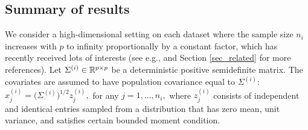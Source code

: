 \subsection{Summary of results}

We consider a high-dimensional setting on each dataset where the sample size $n_i$ increases with $p$ to infinity proportionally by a constant factor, which has recently received lots of interests (see e.g., \citet{hastie2019surprises} and Section \ref{sec_related} for more references).
Let $\Sigma^{(i)} \in \mathbb{R}^{p\times p}$ be a deterministic positive semidefinite matrix.
The covariates are assumed to have population covariance equal to $\Sigma^{(i)}$: $x_j^{(i)} = \big(\Sigma^{(i)}\big)^{1/2} z_{j}^{(i)},$ for any $j = 1,\dots,n_i,$
where $z_j^{(i)}$ consists of independent and identical entries sampled from a distribution that has zero mean, unit variance, and satisfies certain bounded moment condition.

